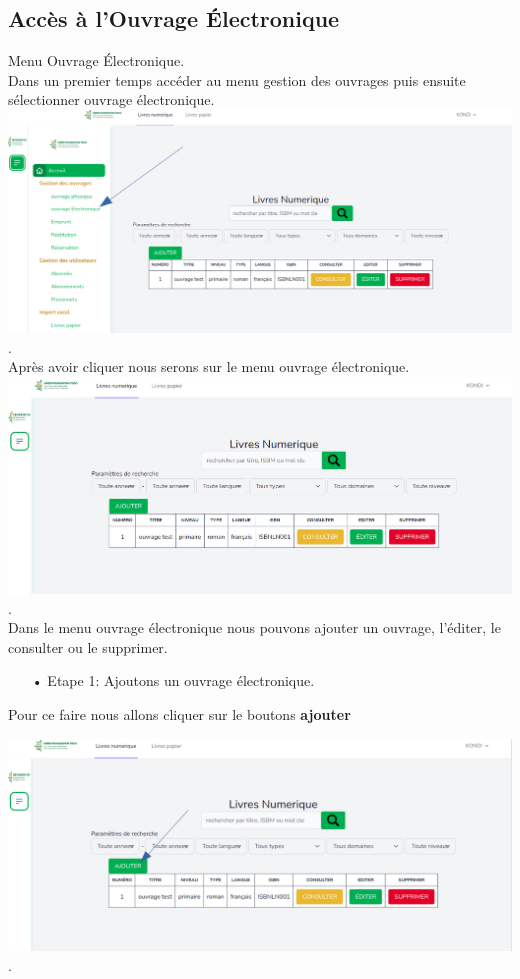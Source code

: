 \documentclass[12pt,a4paper]{article}
\begin{document}
\subsection{Accès à l'Ouvrage Électronique}
Menu Ouvrage Électronique.\\
Dans un premier temps accéder au menu gestion des ouvrages puis ensuite sélectionner ouvrage électronique.\\
\includegraphics[scale=0.4]{images/OuVELectro.png}.\\

Après avoir cliquer nous serons sur le menu ouvrage électronique.\\

\includegraphics[scale=0.4]{images/TashBoardElectro.png}.\\

Dans le menu ouvrage électronique nous pouvons ajouter un ouvrage, l'éditer, le consulter ou le supprimer.

\begin{itemize}
\item[•]Etape 1: Ajoutons un ouvrage électronique.
\end{itemize}

Pour ce faire nous allons cliquer sur le boutons \textbf{ajouter} 

\includegraphics[scale=0.5]{images/BoutonsAjout.png}. \\
\end{document}
